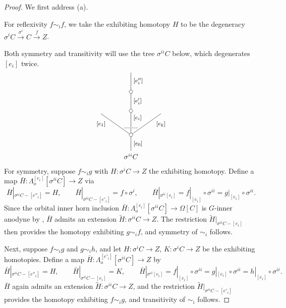 \documentclass[a4paper,10pt
,draft
]{article}%
\numberwithin{equation}{section}
\numberwithin{figure}{section}
\theoremstyle{definition} %
\newcommand{\1}{\ensuremath{\mathbbm 1}}%
\begin{document}
\begin{proof}
	We first address (a). 
	
	For reflexivity $f \sim_i f$,
	we take the exhibiting homotopy 
	$H$ to be the degeneracy
	$\sigma^i C \xrightarrow{\sigma^i} C \xrightarrow{f} Z$.
	
	Both symmetry and transitivity will use the 
	tree $\sigma^{ii} C$ below, which degenerates $[e_i]$ twice.
\[
\begin{tikzpicture}
[grow=up,auto,level distance=3em,
every node/.style = {font=\footnotesize},
dummy/.style={circle,draw,inner sep=0pt,minimum size=1.75mm}]
	\node at (0,0) [font=\normalsize]{$\sigma^{ii} C$}
		child{node [dummy] {}
			child{
			edge from parent node [swap,near end] {$[e_k]$} node [near start,inner sep=1pt,name=Kn] {}}
			child[level distance=3.4em]{node [dummy] {}
				child[level distance=2.7em]{node [dummy] {}
					child[level distance=2.7em]{
					edge from parent node [swap] {$[e''_i]$}
}
				edge from parent node [swap] {$[e'_i]$}
}
			edge from parent node [near end,swap] {$[e_i]$}
node [near start,inner sep=1pt,name=Kone,swap] {}
node [near start,inner sep=1pt,name=Kone1] {}}
			child{
			edge from parent node [near end] {$[e_1]$}
node [swap] {}
node [near start,inner sep=1pt,name=Kn1,swap]{}}
		edge from parent node [swap] {$[e_0]$}
		};
		\draw [dotted,thick] (Kone) -- (Kn) ;
		\draw [dotted,thick] (Kone1) -- (Kn1) ;
\end{tikzpicture}
\]
For symmetry, suppose $f \sim_i g$ with 
$H \colon \sigma^{i} C \to Z$ the exhibiting homotopy.
Define a map 
$\bar{H} \colon \Lambda^{[e_i]}_o[\sigma^{ii} C] \to Z$ via
\[
	\bar{H}|_{\sigma^{ii}C - [e''_i]} = H,
		\qquad
	\bar{H}|_{\sigma^{ii}C - [e'_i]} = f \circ \sigma^i,
		\qquad
	\bar{H}|_{\sigma^{ii} [e_i]} = 
	f|_{[e_i]} \circ \sigma^{ii} =
	g|_{[e_i]} \circ \sigma^{ii}.
\]
Since the orbital inner horn inclusion
$\bar{H} \colon \Lambda^{[e_i]}_o[\sigma^{ii} C] \to \Omega[C]$
is $G$-inner anodyne by \cite[Prop. 3.13]{BP_edss},
$\bar{H}$ admits an extension $\widetilde{H} \colon \sigma^{ii}C \to Z$.
The restriction $\widetilde{H}|_{\sigma^{ii}C - [e_i]}$ then provides the homotopy exhibiting $g \sim_i f$, and symmetry of $\sim_i$ follows.

Next, suppose $f \sim_i g$ and $g \sim_i h$, and let 
$H \colon \sigma^{i} C \to Z$,
$K \colon \sigma^{i} C \to Z$ be the exhibiting homotopies.
Define a map 
$\bar{H} \colon \Lambda^{[e'_i]}_o[\sigma^{ii} C] \to Z$ by
\[
	\bar{H}|_{\sigma^{ii}C - [e''_i]} = H,
		\qquad
	\bar{H}|_{\sigma^{ii}C - [e_i]} = K,
		\qquad
	\bar{H}|_{\sigma^{ii} [e_i]} = 
	f|_{[e_i]} \circ \sigma^{ii} =
	g|_{[e_i]} \circ \sigma^{ii} =
	h|_{[e_i]} \circ \sigma^{ii}.
\]
$\bar{H}$ again admits an extension $\widetilde{H} \colon \sigma^{ii}C \to Z$, 
and the restriction $\widetilde{H}|_{\sigma^{ii}C - [e'_i]}$
provides the homotopy exhibiting $f \sim_i g$, and transitivity of $\sim_i$ follows.



\end{proof}
\end{document}
